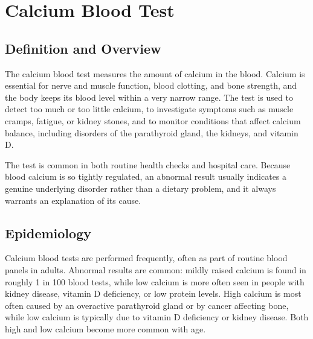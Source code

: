 \chapter{Calcium Blood Test}

\section*{Definition and Overview}
The calcium blood test measures the amount of calcium in the blood. Calcium is essential for nerve and muscle function, blood clotting, and bone strength, and the body keeps its blood level within a very narrow range. The test is used to detect too much or too little calcium, to investigate symptoms such as muscle cramps, fatigue, or kidney stones, and to monitor conditions that affect calcium balance, including disorders of the parathyroid gland, the kidneys, and vitamin D.

The test is common in both routine health checks and hospital care. Because blood calcium is so tightly regulated, an abnormal result usually indicates a genuine underlying disorder rather than a dietary problem, and it always warrants an explanation of its cause.

\section*{Epidemiology}
Calcium blood tests are performed frequently, often as part of routine blood panels in adults. Abnormal results are common: mildly raised calcium is found in roughly 1 in 100 blood tests, while low calcium is more often seen in people with kidney disease, vitamin D deficiency, or low protein levels. High calcium is most often caused by an overactive parathyroid gland or by cancer affecting bone, while low calcium is typically due to vitamin D deficiency or kidney disease. Both high and low calcium become more common with age.

